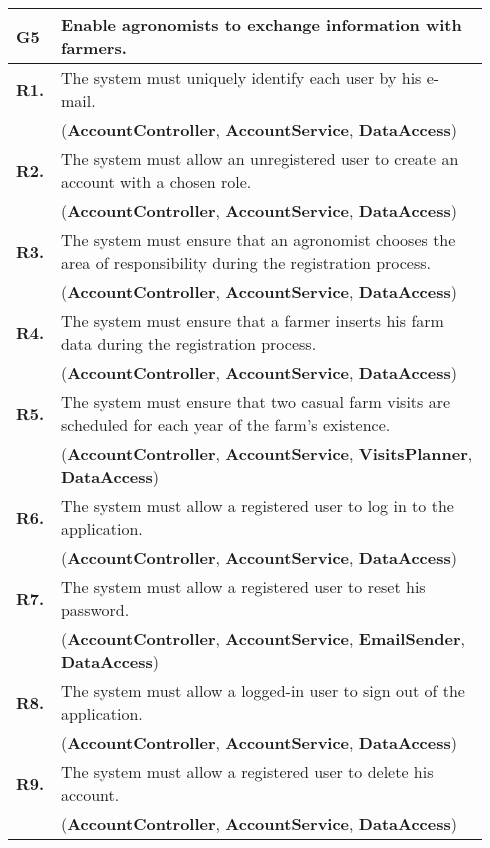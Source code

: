 \begin{longtable}{p{0.06\linewidth} p{0.88\linewidth}} 
    \toprule
    \textbf{G5} & Enable agronomists to exchange information with farmers. \\ 
    \midrule
    
	\textbf{R1.} & The system must uniquely identify each user by his e-mail. \\
	& (\textbf{AccountController}, \textbf{AccountService}, \textbf{DataAccess})\\
	\textbf{R2.} & The system must allow an unregistered user to create an account with a chosen role. \\
	& (\textbf{AccountController}, \textbf{AccountService}, \textbf{DataAccess})\\
	\textbf{R3.} & The system must ensure that an agronomist chooses the area of responsibility during the registration process. \\
	& (\textbf{AccountController}, \textbf{AccountService}, \textbf{DataAccess})\\
	\textbf{R4.} & The system must ensure that a farmer inserts his farm data during the registration process.\\
	& (\textbf{AccountController}, \textbf{AccountService}, \textbf{DataAccess})\\
	\textbf{R5.} & The system must ensure that two casual farm visits are scheduled for each year of the farm's existence.\\
	& (\textbf{AccountController}, \textbf{AccountService}, \textbf{VisitsPlanner},
	\textbf{DataAccess})\\
	\textbf{R6.} & The system must allow a registered user to log in to the application. \\
	& (\textbf{AccountController}, \textbf{AccountService}, \textbf{DataAccess})\\
	\textbf{R7.} & The system must allow a registered user to reset his password. \\
	& (\textbf{AccountController}, \textbf{AccountService}, \textbf{EmailSender}, \textbf{DataAccess})\\
	\textbf{R8.} & The system must allow a logged-in user to sign out of the application. \\
	& (\textbf{AccountController}, \textbf{AccountService}, \textbf{DataAccess}) \todo{stateless?}\\
	\textbf{R9.} & The system must allow a registered user to delete his account. \\
	& (\textbf{AccountController}, \textbf{AccountService}, \textbf{DataAccess})\\
	

\end{longtable}
